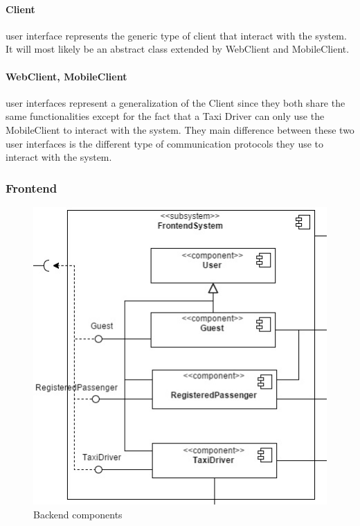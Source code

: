 		\paragraph{Client} user interface represents the generic type of client that interact with the system. It will most likely be an abstract class extended by WebClient and MobileClient.
		\paragraph{WebClient, MobileClient} user interfaces represent a generalization of the Client since they both share the same functionalities except for the fact that a Taxi Driver can only use the MobileClient to interact with the system. They main difference between these two user interfaces is the different type of communication protocols they use to interact with the system.
	\subsubsection{Frontend}
		\begin{figure}[h!]
			\begin{center}
				\includegraphics[width=1\linewidth]{../SE2_IMAGES/Frontend}
				\caption{Backend components}
			\end{center}
		\end{figure}
